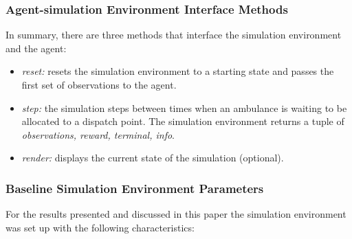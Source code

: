 \documentclass{article}
\begin{document}
\subsubsection{Agent-simulation Environment Interface Methods}

In summary, there are three methods that interface the simulation environment and the agent:

\begin{itemize}

    \item \emph{reset:} resets the simulation environment to a starting state and passes the first set of observations to the agent.
    
    \item \emph{step:} the simulation steps between times when an ambulance is waiting to be allocated to a dispatch point. The simulation environment returns a tuple of \emph{observations, reward, terminal, info}.
    
    \item \emph{render:} displays the current state of the simulation (optional).

\end{itemize}

\subsubsection{Baseline Simulation Environment Parameters}
\label{baseline}

For the results presented and discussed in this paper the simulation environment was set up with the following characteristics:
\end{document}
